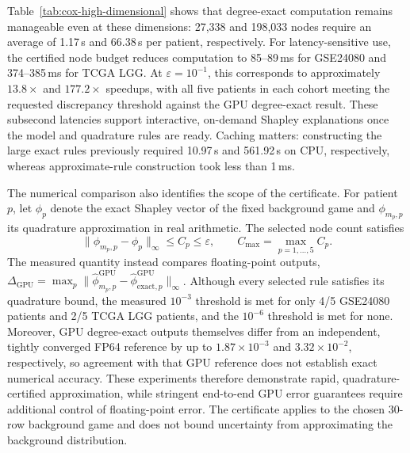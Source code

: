 Table~\ref{tab:cox-high-dimensional} shows that degree-exact computation
remains manageable even at these dimensions: 27,338 and 198,033 nodes
require an average of 1.17\,s and 66.38\,s per patient, respectively.
For latency-sensitive use, the certified node budget reduces computation
to 85--89\,ms for GSE24080 and 374--385\,ms for TCGA LGG.
At $\varepsilon=10^{-1}$, this corresponds to approximately
$13.8\times$ and $177.2\times$ speedups, with all five patients in each
cohort meeting the requested discrepancy threshold against the GPU
degree-exact result. These subsecond latencies support interactive,
on-demand Shapley explanations once the model and quadrature rules are ready.
Caching matters: constructing the large exact rules previously required
10.97\,s and 561.92\,s on CPU, respectively, whereas approximate-rule
construction took less than 1\,ms.

The numerical comparison also identifies the scope of the certificate.
For patient $p$, let $\phi_p$ denote the exact Shapley vector of the fixed
background game and $\phi_{m_p,p}$ its quadrature approximation in real
arithmetic. The selected node count satisfies
\[
\|\phi_{m_p,p}-\phi_p\|_\infty\le C_p\le\varepsilon,
\qquad C_{\max}=\max_{p=1,\ldots,5}C_p.
\]
The measured quantity instead compares floating-point outputs,
$\Delta_{\mathrm{GPU}}=
\max_p\|\widehat\phi^{\mathrm{GPU}}_{m_p,p}
-\widehat\phi^{\mathrm{GPU}}_{\mathrm{exact},p}\|_\infty$.
Although every selected rule satisfies its quadrature bound,
the measured $10^{-3}$ threshold is met for only 4/5 GSE24080 patients
and 2/5 TCGA LGG patients, and the $10^{-6}$ threshold is met for none.
Moreover, GPU degree-exact outputs themselves differ from an independent,
tightly converged FP64 reference by up to $1.87\times10^{-3}$ and
$3.32\times10^{-2}$, respectively, so agreement with that GPU reference
does not establish exact numerical accuracy.
These experiments therefore demonstrate rapid, quadrature-certified
approximation, while stringent end-to-end GPU error guarantees require
additional control of floating-point error. The certificate applies to
the chosen 30-row background game and does not bound uncertainty from
approximating the background distribution.
